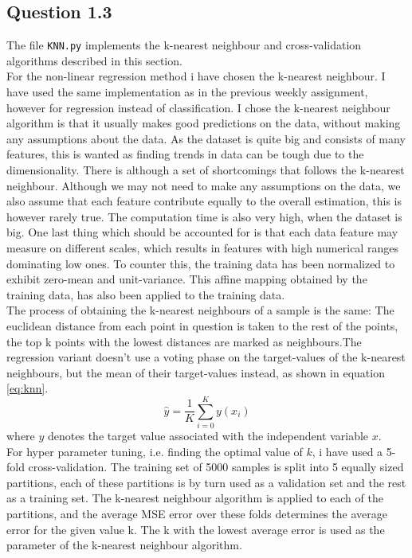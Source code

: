 \documentclass{article}
\begin{document}
\subsection{Question 1.3}
The file \texttt{KNN.py} implements the k-nearest neighbour and cross-validation algorithms described in this section.
\\
For the non-linear regression method i have chosen the k-nearest neighbour. I have used the same implementation as in the previous weekly assignment, however for regression instead of classification.
I chose the k-nearest neighbour algorithm is that it usually makes good predictions on the data, without making any assumptions about the data. As the dataset is quite big and consists of many features, this is wanted as finding trends in data can be tough due to the dimensionality. There is although a set of shortcomings that follows the k-nearest neighbour. Although we may not need to make any assumptions on the data, we also assume that each feature contribute equally to the overall estimation, this is however rarely true. The computation time is also very high, when the dataset is big. One last thing which should be accounted for is that each data feature may measure on different scales, which results in features with high numerical ranges dominating low ones. To counter this, the training data has been normalized to exhibit zero-mean and unit-variance. This affine mapping obtained by the training data, has also been applied to the training data. \\
The process of obtaining the k-nearest neighbours of a sample is the same: The euclidean distance from each point in question is taken to the rest of the points, the top k points with the lowest distances are marked as neighbours.The regression variant doesn't use a voting phase 
on the target-values of the k-nearest neighbours, but the mean of their target-values instead, as shown in equation \eqref{eq:knn}.
\begin{equation}
\hat{y} =  \dfrac{1}{K} \sum\limits_{i=0}^K y(x_i)
\label{eq:knn}
\end{equation}
where $y$ denotes the target value associated with the independent variable $x$. \\
For hyper parameter tuning, i.e. finding the optimal value of $k$, i have used a 5-fold cross-validation. The training set of 5000 samples is split into 5 equally sized partitions, each of these partitions is by turn used as a validation set and the rest as a training set. The k-nearest neighbour algorithm is applied to each of the partitions, and the average MSE error over these folds determines the average error for the given value k. The k with the lowest average error is used as the parameter of the k-nearest neighbour algorithm.
\\
\end{document}
